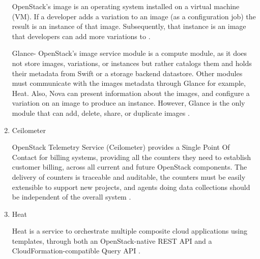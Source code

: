 \begin{enumerate}
        \par
        OpenStack's image is an operating system installed on a virtual machine (VM). If a developer adds a variation to an image (as a configuration job) the result is an instance of that image. Subsequently, that instance is an image that developers can add more variations to \cite{wiki}.
        \par
        Glance- OpenStack's image service module is a compute module, as it does not store images, variations, or instances but rather catalogs them and holds their metadata from Swift or a storage backend datastore. Other modules must communicate with the images metadata through Glance for example, Heat. Also, Nova can present information about the images, and configure a variation on an image to produce an instance. However, Glance is the only module that can add, delete, share, or duplicate images \cite{wiki}.
        \item Ceilometer
        \par
        OpenStack Telemetry Service (Ceilometer) provides a Single Point Of Contact for billing systems, providing all the counters they need to establish customer billing, across all current and future OpenStack components. The delivery of counters is traceable and auditable, the counters must be easily extensible to support new projects, and agents doing data collections should be independent of the overall system \cite{wiki}.
        
        \item Heat
        \par
        Heat is a service to orchestrate multiple composite cloud applications using templates, through both an OpenStack-native REST API and a CloudFormation-compatible Query API \cite{wiki}.
     \end{enumerate}
     
